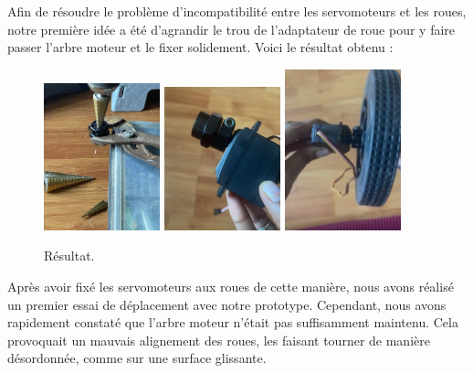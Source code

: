 \documentclass[a4paper,12pt]{report}  %
\begin{document}
Afin de résoudre le problème d’incompatibilité entre les servomoteurs et les roues, notre première idée a été d’agrandir le trou de l’adaptateur de roue pour y faire passer l’arbre moteur et le fixer solidement. Voici le résultat obtenu :

\begin{figure}[H]
	\centering
	\includegraphics[width=0.3\textwidth]{./attachments/fixage-1.png}
	\includegraphics[width=0.3\textwidth]{./attachments/fixage-2.png}
	\includegraphics[width=0.3\textwidth]{./attachments/fixage-3.png}
	
	\caption{Résultat.}
\end{figure}



Après avoir fixé les servomoteurs aux roues de cette manière, nous avons réalisé un premier essai de déplacement avec notre prototype. Cependant, nous avons rapidement constaté que l’arbre moteur n’était pas suffisamment maintenu. Cela provoquait un mauvais alignement des roues, les faisant tourner de manière désordonnée, comme sur une surface glissante.
\end{document}
